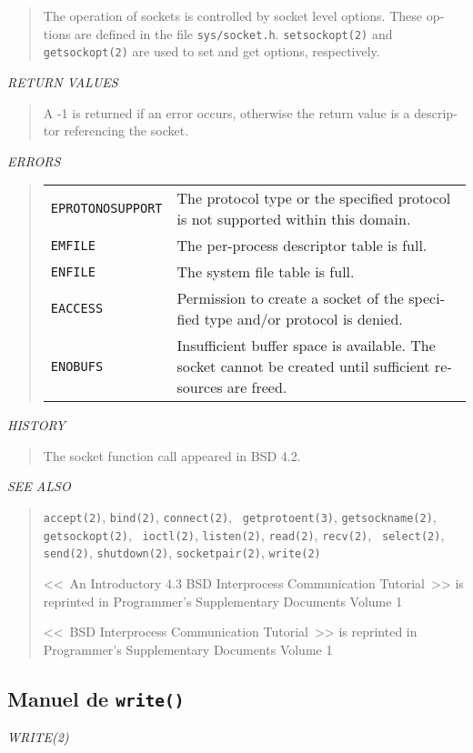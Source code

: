 \begin{appendix}
\begin{english}
\begin{quote}
	The operation of sockets is controlled by socket level options. 
	These options are defined in the file {\tt sys/socket.h}. 
	{\tt setsockopt(2)} and {\tt getsockopt(2)} are used to set and get options,
	respectively.
\end{quote}

{\sl RETURN VALUES}
\begin{quote}
	A  -1 is returned if an error occurs, otherwise the return
	value is a descriptor referencing the socket.
\end{quote}

{\sl ERRORS}
\begin{quote}
\begin{tabular}{lp{8cm}}
	{\tt EPROTONOSUPPORT}	&
		The protocol type or the specified protocol is not supported within
		this domain.\\
	{\tt EMFILE}	&
		The per-process descriptor table is full.\\
	{\tt ENFILE}	&
		The system file table is full.\\
	{\tt EACCESS}	&
		Permission to create a socket of the specified type and/or protocol
		is denied.\\
	{\tt ENOBUFS}	&
		Insufficient buffer space is available. The socket cannot be created
		until sufficient resources are freed.
	\end{tabular}
\end{quote}

{\sl HISTORY}
\begin{quote}
	The socket function call appeared in BSD 4.2.
\end{quote}

{\sl SEE ALSO}
\begin{quote}
	{\tt accept(2)}, {\tt bind(2)}, {\tt connect(2)}, {\tt
	getprotoent(3)}, {\tt getsockname(2)}, {\tt getsockopt(2)}, {\tt
	ioctl(2)}, {\tt listen(2)}, {\tt read(2)}, {\tt recv(2)}, {\tt
	select(2)}, {\tt send(2)}, {\tt shutdown(2)}, {\tt socketpair(2)},
	{\tt write(2)}

	<<~An Introductory 4.3 BSD Interprocess Communication Tutorial~>> is
	reprinted in {\Unix} Programmer's Supplementary Documents Volume 1

	<<~BSD Interprocess Communication Tutorial~>> is reprinted in {\Unix}
	Programmer's Supplementary Documents Volume 1
\end{quote}
\end{english}

\subsection{Manuel de {\tt write()}}
\begin{english}
{\sl WRITE(2)}\\


\end{english}
\end{appendix}
